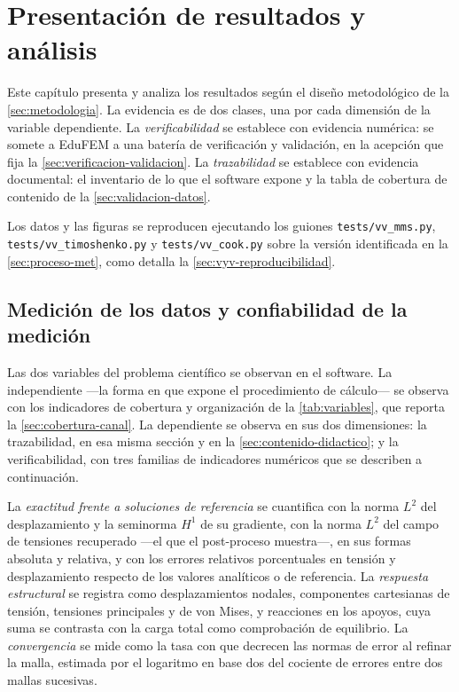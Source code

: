 \chapter{Presentación de resultados y análisis}
\label{cap:resultados}


Este capítulo presenta y analiza los resultados según el diseño metodológico de la \autoref{sec:metodologia}. La evidencia es de dos clases, una por cada dimensión de la variable dependiente. La \emph{verificabilidad} se establece con evidencia numérica: se somete a EduFEM a una batería de verificación y validación, en la acepción que fija la \autoref{sec:verificacion-validacion}. La \emph{trazabilidad} se establece con evidencia documental: el inventario de lo que el software expone y la tabla de cobertura de contenido de la \autoref{sec:validacion-datos}.

Los datos y las figuras se reproducen ejecutando los guiones \texttt{tests/vv\_mms.py}, \texttt{tests/vv\_timoshenko.py} y \texttt{tests/vv\_cook.py} sobre la versión identificada en la \autoref{sec:proceso-met}, como detalla la \autoref{sec:vyv-reproducibilidad}.

\section{Medición de los datos y confiabilidad de la medición}
\label{sec:medicion}

Las dos variables del problema científico se observan en el software. La independiente —la forma en que expone el procedimiento de cálculo— se observa con los indicadores de cobertura y organización de la \autoref{tab:variables}, que reporta la \autoref{sec:cobertura-canal}. La dependiente se observa en sus dos dimensiones: la trazabilidad, en esa misma sección y en la \autoref{sec:contenido-didactico}; y la verificabilidad, con tres familias de indicadores numéricos que se describen a continuación.

La \emph{exactitud frente a soluciones de referencia} se cuantifica con la norma $L^2$ del desplazamiento y la seminorma $H^1$ de su gradiente, con la norma $L^2$ del campo de tensiones recuperado —el que el post-proceso muestra—, en sus formas absoluta y relativa, y con los errores relativos porcentuales en tensión y desplazamiento respecto de los valores analíticos o de referencia. La \emph{respuesta estructural} se registra como desplazamientos nodales, componentes cartesianas de tensión, tensiones principales y de von Mises, y reacciones en los apoyos, cuya suma se contrasta con la carga total como comprobación de equilibrio. La \emph{convergencia} se mide como la tasa con que decrecen las normas de error al refinar la malla, estimada por el logaritmo en base dos del cociente de errores entre dos mallas sucesivas.

